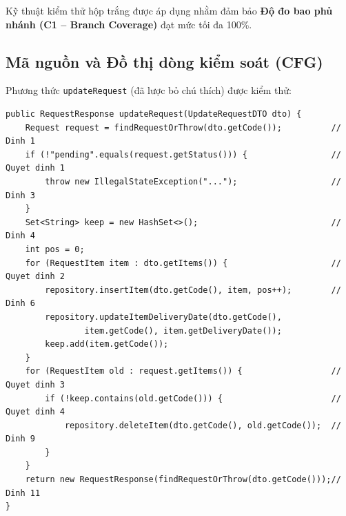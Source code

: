 \documentclass[12pt,a4paper]{article}
\begin{document}
Kỹ thuật kiểm thử hộp trắng được áp dụng nhằm đảm bảo \textbf{Độ đo bao phủ nhánh (C1 -- Branch Coverage)} đạt mức tối đa 100\%.

\subsection{Mã nguồn và Đồ thị dòng kiểm soát (CFG)}
Phương thức \texttt{updateRequest} (đã lược bỏ chú thích) được kiểm thử:

\begin{lstlisting}
public RequestResponse updateRequest(UpdateRequestDTO dto) {
    Request request = findRequestOrThrow(dto.getCode());          // Dinh 1
    if (!"pending".equals(request.getStatus())) {                 // Quyet dinh 1
        throw new IllegalStateException("...");                   // Dinh 3
    }
    Set<String> keep = new HashSet<>();                           // Dinh 4
    int pos = 0;
    for (RequestItem item : dto.getItems()) {                     // Quyet dinh 2
        repository.insertItem(dto.getCode(), item, pos++);        // Dinh 6
        repository.updateItemDeliveryDate(dto.getCode(),
                item.getCode(), item.getDeliveryDate());
        keep.add(item.getCode());
    }
    for (RequestItem old : request.getItems()) {                  // Quyet dinh 3
        if (!keep.contains(old.getCode())) {                      // Quyet dinh 4
            repository.deleteItem(dto.getCode(), old.getCode());  // Dinh 9
        }
    }
    return new RequestResponse(findRequestOrThrow(dto.getCode()));// Dinh 11
}
\end{lstlisting}
\end{document}
